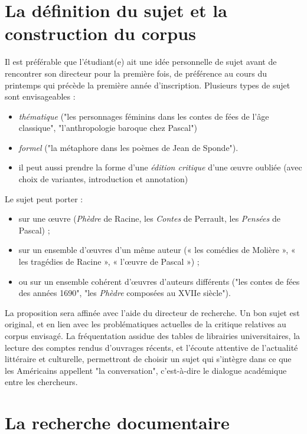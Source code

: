 \documentclass[12pt,twoside,final,openright]{book}
\begin{document}
\section {La définition du sujet et la construction du corpus}
Il est préférable que l’étudiant(e) ait une idée personnelle de sujet avant de rencontrer son directeur pour la première fois, de préférence au cours du printemps qui précède la première année d’inscription.
Plusieurs types de sujet sont envisageables :

\begin{itemize}
\item \textit{thématique} ("les personnages féminins dans les contes de fées de l’âge classique",  "l’anthropologie baroque chez Pascal")
\item \textit{formel} ("la métaphore dans les poèmes de Jean de Sponde").
\item il peut aussi prendre la forme d’une \textit{édition critique} d’une œuvre oubliée (avec choix de variantes, introduction et annotation)
\end{itemize}

Le sujet peut porter : 
\begin{itemize}
	\item sur une œuvre (\textit{Phèdre} de Racine, les \textit{Contes} de Perrault, les \textit{Pensées} de Pascal) ; 
	\item sur un ensemble d’œuvres d’un même auteur (« les comédies de Molière », « les tragédies de Racine », « l’\oe uvre de Pascal ») ;
	\item ou sur un ensemble cohérent d’œuvres d’auteurs différents ("les contes de fées des années 1690", "les \textit{Phèdre} composées au XVIIe siècle").
\end{itemize}

La proposition sera affinée avec l’aide du directeur de recherche. Un bon sujet est original, et en lien avec les problématiques actuelles de la critique relatives au corpus envisagé. La fréquentation assidue des tables de librairies universitaires, la lecture des comptes rendus d’ouvrages récents, et l’écoute attentive de l’actualité littéraire et culturelle, permettront de choisir un sujet qui s’intègre dans ce que les Américains appellent "la conversation", c’est-à-dire le dialogue académique entre les chercheurs.

\section{La recherche documentaire}
\end{document}

